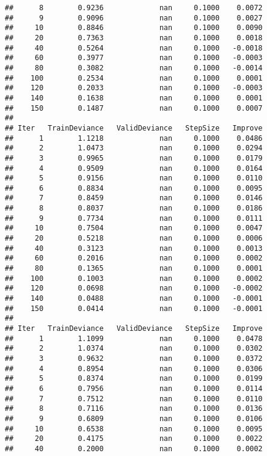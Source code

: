 \documentclass[]{article}
\begin{document}
\begin{verbatim}
##      8        0.9236             nan     0.1000    0.0072
##      9        0.9096             nan     0.1000    0.0027
##     10        0.8846             nan     0.1000    0.0090
##     20        0.7363             nan     0.1000    0.0018
##     40        0.5264             nan     0.1000   -0.0018
##     60        0.3977             nan     0.1000   -0.0003
##     80        0.3082             nan     0.1000   -0.0014
##    100        0.2534             nan     0.1000    0.0001
##    120        0.2033             nan     0.1000   -0.0003
##    140        0.1638             nan     0.1000    0.0001
##    150        0.1487             nan     0.1000    0.0007
## 
## Iter   TrainDeviance   ValidDeviance   StepSize   Improve
##      1        1.1218             nan     0.1000    0.0486
##      2        1.0473             nan     0.1000    0.0294
##      3        0.9965             nan     0.1000    0.0179
##      4        0.9509             nan     0.1000    0.0164
##      5        0.9156             nan     0.1000    0.0110
##      6        0.8834             nan     0.1000    0.0095
##      7        0.8459             nan     0.1000    0.0146
##      8        0.8037             nan     0.1000    0.0186
##      9        0.7734             nan     0.1000    0.0111
##     10        0.7504             nan     0.1000    0.0047
##     20        0.5218             nan     0.1000    0.0006
##     40        0.3123             nan     0.1000    0.0013
##     60        0.2016             nan     0.1000    0.0002
##     80        0.1365             nan     0.1000    0.0001
##    100        0.1003             nan     0.1000    0.0002
##    120        0.0698             nan     0.1000   -0.0002
##    140        0.0488             nan     0.1000   -0.0001
##    150        0.0414             nan     0.1000   -0.0001
## 
## Iter   TrainDeviance   ValidDeviance   StepSize   Improve
##      1        1.1099             nan     0.1000    0.0478
##      2        1.0374             nan     0.1000    0.0302
##      3        0.9632             nan     0.1000    0.0372
##      4        0.8954             nan     0.1000    0.0306
##      5        0.8374             nan     0.1000    0.0199
##      6        0.7956             nan     0.1000    0.0114
##      7        0.7512             nan     0.1000    0.0110
##      8        0.7116             nan     0.1000    0.0136
##      9        0.6809             nan     0.1000    0.0106
##     10        0.6538             nan     0.1000    0.0095
##     20        0.4175             nan     0.1000    0.0022
##     40        0.2000             nan     0.1000    0.0002

\end{verbatim}
\end{document}
